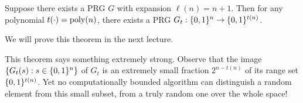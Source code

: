 \documentclass[11pt]{article}
\begin{document}
\begin{theorem}
  \label{thm:expansion}
  Suppose there exists a PRG $G$ with expansion $\ell(n)=n+1$.  Then
  for any polynomial $t(\cdot) = \operatorname{poly}(n)$, there exists a PRG
  $G_t: \{0,1\}^n \to \{0,1\}^{t(n)}$.
\end{theorem}

\noindent
We will prove this theorem in the next lecture.

\begin{remark}
  This theorem says something extremely strong.  Observe that the
  image $\{G_{t}(s) : s \in \{0,1\}^{n}\}$ of $G_t$ is an extremely
  small fraction $2^{n-t(n)}$ of its range set $\{0,1\}^{t(n)}$.  Yet no
  computationally bounded algorithm can distinguish a random element
  from this small subset, from a truly random one over the whole
  space!
\end{remark}
\end{document}
